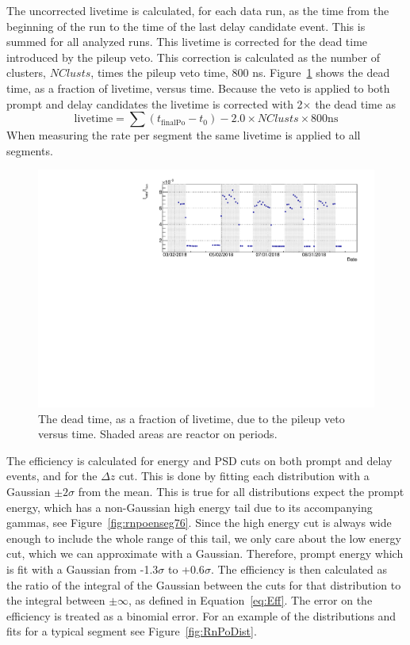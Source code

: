 The uncorrected livetime is calculated, for each data run, as the time from the beginning of the run to the time of the last delay candidate event. 
This is summed for all analyzed runs. 
This livetime is corrected for the dead time introduced by the pileup veto.
This correction is calculated as the number of clusters, $NClusts$, times the pileup veto time, 800 ns.
Figure~\ref{fig:vetotimevstime} shows the dead time, as a fraction of livetime, versus time.
Because the veto is applied to both prompt and delay candidates the livetime is corrected with 2$\times$ the dead time as
\begin{equation}
	\textrm{livetime} = \sum(t_{\textrm{finalPo}} - t_0) - 2.0 \times NClusts \times 800\textrm{ns}
\end{equation}
When measuring the rate per segment the same livetime is applied to all segments. 

\begin{figure}[!t]
	\centering
	\includegraphics[width=0.8\linewidth]{tex/6-ac227-images/AD_RateCalc/VetoTimeVsTime}
	\caption{The dead time, as a fraction of livetime, due to the pileup veto versus time. Shaded areas are reactor on periods.}
	\label{fig:vetotimevstime}
\end{figure}

The efficiency is calculated for energy and PSD cuts on both prompt and delay events, and for the $\Delta z$ cut.
This is done by fitting each distribution with a Gaussian $\pm 2\sigma$ from the mean.
This is true for all distributions expect the prompt energy, which has a non-Gaussian high energy tail due to its accompanying gammas, see Figure~\ref{fig:rnpoenseg76}. 
Since the high energy cut is always wide enough to include the whole range of this tail, we only care about the low energy cut, which we can approximate with a Gaussian.
Therefore, prompt energy which is fit with a Gaussian from -1.3$\sigma$ to +0.6$\sigma$.
The efficiency is then calculated as the ratio of the integral of the Gaussian
between the cuts for that distribution to the integral between $\pm \infty$, as defined in Equation~\ref{eq:Eff}.
The error on the efficiency is treated as a binomial error.
For an example of the distributions and fits for a typical segment see Figure~\ref{fig:RnPoDist}.

